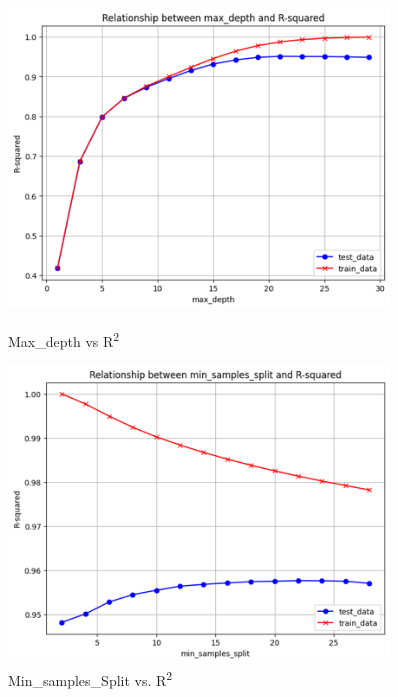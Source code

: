 \documentclass{article}
\begin{document}
\begin{figure}[h] %
    \centering

    \begin{minipage}{0.48\textwidth}
        \centering
        \includegraphics[width=0.9\textwidth]{unnamed.png}
        \caption{Max\_depth vs R\textsuperscript{2}}
        \label{pic1} %
    \end{minipage}\hfill
    \begin{minipage}{0.48\textwidth}
        \centering
        \includegraphics[width=0.9\textwidth]{unnamed-2.png}
        \caption{Min\_samples\_Split vs. R\textsuperscript{2}}
        \label{pic2} %
    \end{minipage}


\end{figure}
\end{document}
